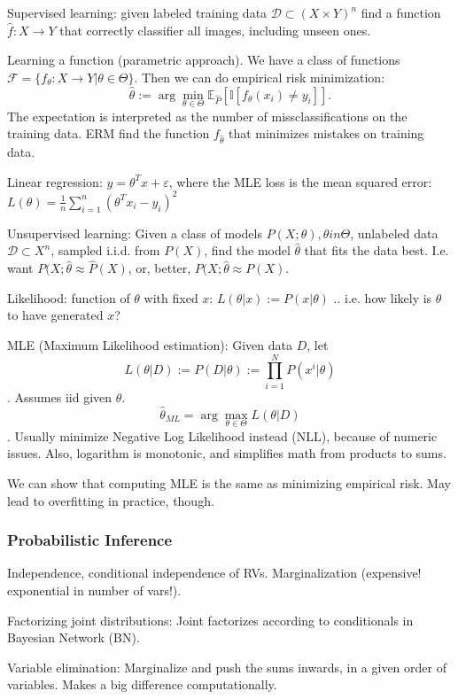 \documentclass{article}
\newcommand{\E}[2]{\mathbb{E}_{#1}\left[#2\right]}
\newcommand{\mc}[1]{\mathcal{#1}}
\newcommand{\I}[1]{\mathbb{I}\left[#1\right]}
\begin{document}
Supervised learning: given labeled training data $\mc{D} \subset (X \times Y)^n$ find a function $\hat{f}: X \to Y$ that correctly classifier all images, including unseen ones.

Learning a function (parametric approach). We have a class of functions $\mc{F} = \{f_\theta: X \to Y | \theta \in \Theta\}$. Then we can do empirical risk minimization: $$\hat{\theta} := \arg\min_{\theta \in \Theta} \E{\hat{P}}{\I{f_\theta(x_i) \neq y_i}}.$$ The expectation is interpreted as the number of missclassifications on the training data. ERM find the function $f_{\hat{\theta}}$ that minimizes mistakes on training data.

Linear regression: $y=\theta^Tx + \varepsilon$, where the MLE loss is the mean squared error: $L(\theta) = \frac{1}{n} \sum_{i=1}^n (\theta^Tx_i - y_i)^2$

Unsupervised learning: Given a class of models $P(X; \theta), \theta in \Theta$, unlabeled data $\mc{D} \subset X^n$, sampled i.i.d. from $P(X)$, find the model $\hat{\theta}$ that fits the data best. I.e. want $P(X; \hat{\theta} \approx \hat{P}(X)$, or, better, $P(X; \hat{\theta} \approx P(X)$.

Likelihood: function of $\theta$ with fixed $x$: $L(\theta|x) := P(x|\theta)$ .. i.e. how likely is $\theta$ to have generated $x$?

MLE (Maximum Likelihood estimation): Given data $D$, let $$L(\theta|D) := P(D|\theta) := \prod_{i=1}^N P(x^i|\theta)$$. Assumes iid given $\theta$. $$\hat{\theta}_{ML} = \arg \max_{\theta \in \Theta} L(\theta|D)$$. Usually minimize Negative Log Likelihood instead (NLL), because of numeric issues. Also, logarithm is monotonic, and simplifies math from products to sums.

We can show that computing MLE is the same as minimizing empirical risk. May lead to overfitting in practice, though.

\subsubsection{Probabilistic Inference}

Independence, conditional independence of RVs. Marginalization (expensive! exponential in number of vars!).

Factorizing joint distributions: Joint factorizes according to conditionals in Bayesian Network (BN).

Variable elimination: Marginalize and push the sums inwards, in a given order of variables. Makes a big difference computationally.
\end{document}
